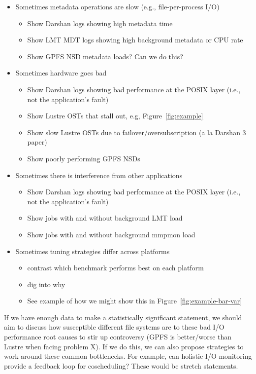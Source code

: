 \documentclass[conference,10pt,compsocconf]{IEEEtran}
\begin{document}
\begin{itemize}
\item Sometimes metadata operations are slow (e.g., file-per-process I/O)
    \begin{itemize}
    \item Show Darshan logs showing high metadata time
    \item Show LMT MDT logs showing high background metadata or CPU rate
    \item Show GPFS NSD metadata loads?  Can we do this?
    \end{itemize}
\item Sometimes hardware goes bad
    \begin{itemize}
    \item Show Darshan logs showing bad performance at the POSIX layer (i.e., not the
    application's fault)
    \item Show Lustre OSTs that stall out, e.g, Figure~\ref{fig:example}
    \item Show slow Lustre OSTs due to failover/oversubscription (a la Darshan 3 paper)
    \item Show poorly performing GPFS NSDs
    \end{itemize}
\item Sometimes there is interference from other applications
    \begin{itemize}
    \item Show Darshan logs showing bad performance at the POSIX layer (i.e., not the
    application's fault)
    \item Show jobs with and without background LMT load
    \item Show jobs with and without background mmpmon load
    \end{itemize}
\item Sometimes tuning strategies differ across platforms
    \begin{itemize}
    \item contrast which benchmark performs best on each platform
    \item dig into why
    \item See example of how we might show this in Figure~\ref{fig:example-bar-var}
    \end{itemize}
\end{itemize}

If we have enough data to make a statistically significant statement, we should
aim to discuss how susceptible different file systems are to these bad I/O
performance root causes to stir up controversy (GPFS is better/worse than
Lustre when facing problem X).  If we do this, we can also propose strategies
to work around these common bottlenecks.  For example, can holistic I/O
monitoring provide a feedback loop for coscheduling?  These would be stretch
statements.
\end{document}
